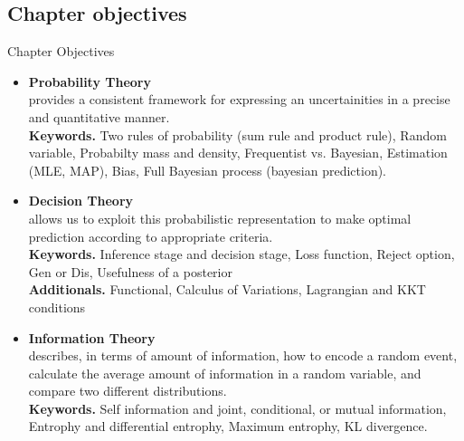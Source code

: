 \documentclass{bredelebeamer}
\begin{document}
\subsection{Chapter objectives}
\begin{frame}{Chapter Objectives}
  \begin{itemize}
    \item \begin{justify}
      \textbf{Probability Theory}\\
      provides a consistent framework for expressing an uncertainities in a
      precise and quantitative manner. \\
      \textbf{Keywords.}
      Two rules of probability (sum rule and product rule), Random variable,
      Probabilty mass and density, Frequentist vs. Bayesian, Estimation (MLE, MAP),
      Bias, Full Bayesian process (bayesian prediction).
    \end{justify}
    \item\begin{justify}
      \textbf{Decision Theory}\\
      allows us to exploit this probabilistic representation to make optimal
      prediction according to appropriate criteria. \\
      \textbf{Keywords.}
      Inference stage and decision stage, Loss function, Reject option,
      Gen or Dis, Usefulness of a posterior \\
      \textbf{Additionals.}
      Functional, Calculus of Variations, Lagrangian and KKT conditions \\
    \end{justify}
    \item\begin{justify}
      \textbf{Information Theory} \\
      describes, in terms of amount of information, how to encode a random event,
      calculate the average amount of information in a random variable, and compare
      two different distributions. \\
      \textbf{Keywords.}
      Self information and joint, conditional, or mutual information,
      Entrophy and differential entrophy, Maximum entrophy, KL divergence.
    \end{justify}
  \end{itemize}

\end{frame}

\end{document}
